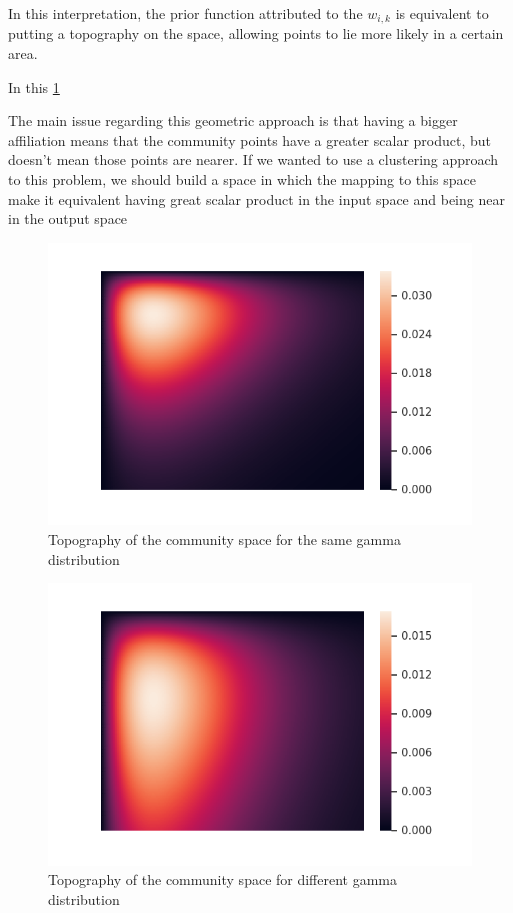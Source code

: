 \documentclass[12pt]{ociamthesis}  %
\begin{document}
	In this interpretation, the prior function attributed to the $w_{i,k}$ is equivalent to putting a topography on the space, allowing points to lie more likely in a certain area.
	
	In this \ref{label-image7}
	
	The main issue regarding this geometric approach is that having a bigger affiliation means that the community points have a greater scalar product, but doesn't mean those points are nearer. If we wanted to use a clustering approach to this problem, we should build a space in which the mapping to this space make it equivalent having great scalar product in the input space and being near in the output space
	
	\begin{figure}
		\centering
		\includegraphics[width=\textwidth,height=\textheight,keepaspectratio]{heatMap}
		\caption{Topography of the community space for the same gamma distribution}
		\label{label-image7}
	\end{figure}

	\begin{figure}
		\centering
		\includegraphics[width=\textwidth,height=\textheight,keepaspectratio]{heatMapCorrection}
		\caption{Topography of the community space for different gamma distribution}
		\label{label-image8}
	\end{figure}
\end{document}
